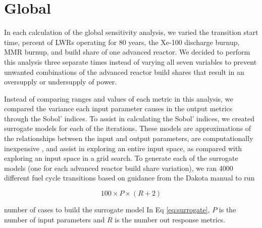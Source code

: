 \section{Global}
In each calculation of the global sensitivity analysis, we varied 
the transition start 
time, percent of \glspl{LWR} operating for 80 years, the Xe-100 discharge 
burnup, \gls{MMR} burnup, and build share of one advanced reactor. 
We decided to perform this analysis three separate times instead of 
varying all seven variables to prevent unwanted combinations of the 
advanced reactor build shares that result in an oversupply or 
undersupply of power. 

Instead of comparing ranges and values of each metric in this 
analysis, we compared the variance each input parameter causes in 
the output metrics through the Sobol' indices. 
To assist in calculating the Sobol' indices, we created surrogate 
models for each of the iterations. These models are approximations 
of the relationships between the input and output parameters,
are computationally inexpensive \cite{adams_dakota_2021}, and 
assist in exploring an entire input space, as compared with 
exploring an input space in a grid search. To generate 
each of the surrogate models (one for each advanced reactor build share 
variation), we ran 4000 different fuel cycle transitions based on guidance 
from the Dakota manual \cite{adams_dakota_2021} to run 

\begin{equation}
    100\times P\times(R+2)
    \label{eq:surrogate}
\end{equation}

\noindent number of cases to build the surrogate model 
In Eq \ref{eq:surrogate}, $P$ is the number of input parameters and 
$R$ is the number out response metrics. 

